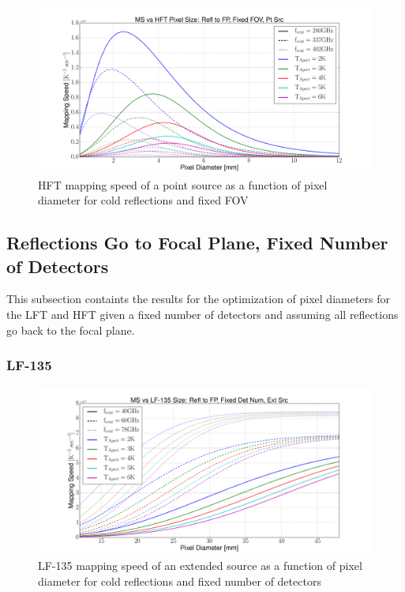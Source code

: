 \documentclass[12pt, titlepage]{article} %
\begin{document}
\begin{figure}[H]
	\centering
	\includegraphics[width=1.1\textwidth, center]{PDF/HFT_MS_coldRefl_fixFOV_ptSrc.pdf}
	\caption{HFT mapping speed of a point source as a function of pixel diameter for cold reflections and fixed FOV}
\end{figure}



\subsection{Reflections Go to Focal Plane, Fixed Number of Detectors}

This subsection containts the results for the optimization of pixel diameters for the LFT and HFT given a fixed number of detectors and assuming all reflections go back to the focal plane.

\clearpage


\subsubsection{LF-135}

\begin{figure}[H]
	\centering
	\includegraphics[width=1.1\textwidth, center]{PDF/LFT_MS_LF-135_coldRefl_fixDetNum_extSrc.pdf}
	\caption{LF-135 mapping speed of an extended source as a function of pixel diameter for cold reflections and fixed number of detectors}
\end{figure}
\end{document}
